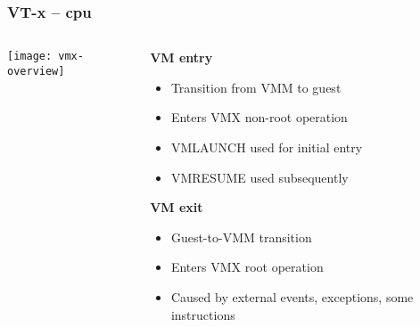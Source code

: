 \begin{frame}[plain]
	\frametitle{VT-x -- cpu}
	
	
	
	\begin{columns}
		
		\begin{column}{.5\textwidth}
			
			\texttt{[image: vmx-overview]}
			
		\end{column}
		
		\begin{column}{.5\textwidth}
			
			\textbf{VM entry}
			
			\begin{itemize}
				\item Transition from VMM to guest
				\item Enters VMX non-root operation
				\item VMLAUNCH used for initial entry
				\item VMRESUME used subsequently
				
			\end{itemize} 
			
			\textbf{VM exit}
			
			\begin{itemize}
				\item Guest-to-VMM transition
				\item Enters VMX root operation
				\item Caused by external events,
				exceptions, some instructions

				
			\end{itemize} 
			
		\end{column}
		
		
	\end{columns}
	
	
\end{frame}

